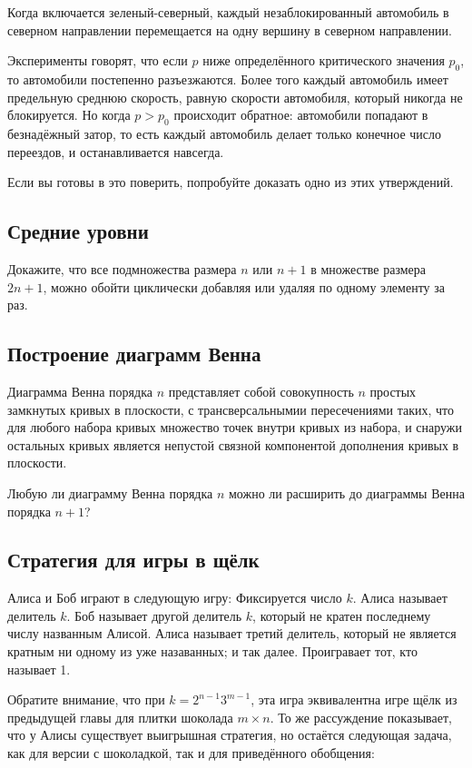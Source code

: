 Когда включается зеленый-северный, каждый незаблокированный автомобиль в северном направлении перемещается на одну вершину в северном направлении.

Эксперименты говорят, что если $p$ ниже определённого критического значения $p_0$,
то автомобили постепенно разъезжаются.
Более того каждый автомобиль имеет предельную среднюю скорость, равную скорости автомобиля, который никогда не блокируется.
Но когда $p> p_0$ происходит обратное: автомобили попадают в безнадёжный затор, то есть каждый автомобиль делает только конечное число переездов, и останавливается навсегда.

Если вы готовы в это поверить, попробуйте доказать одно из этих утверждений.

\subsection*{Средние уровни}

Докажите, что все подмножества размера $n$ или $n+1$ в множестве размера $2n+1$, можно обойти циклически добавляя или удаляя по одному элементу за раз.

\subsection*{Построение диаграмм Венна}

Диаграмма Венна порядка $n$ представляет собой совокупность $n$ простых замкнутых кривых в плоскости, с трансверсальнымии пересечениями таких, что для любого набора кривых множество точек внутри кривых из набора, и снаружи остальных кривых является непустой связной компонентой дополнения кривых в плоскости.

Любую ли диаграмму Венна порядка $n$ можно ли расширить до диаграммы Венна порядка $n+1$?

\subsection*{Стратегия для игры в щёлк}

Алиса и Боб играют в следующую игру:
Фиксируется число $k$.
Алиса называет делитель $k$.
Боб называет другой делитель $k$, который не кратен последнему числу названным Алисой.
Алиса называет третий делитель, который не является кратным ни одному из уже назаванных; 
и так далее.
Проигравает тот, кто называет 1.

Обратите внимание, что при $k=2^{n-1}3^{m-1}$, эта игра эквивалентна игре щёлк из предыдущей главы для плитки шоколада $m\times n$.
То же рассуждение показывает, что у Алисы существует выигрышная стратегия, но остаётся следующая задача, как для версии с шоколадкой, так и для приведённого обобщения:

